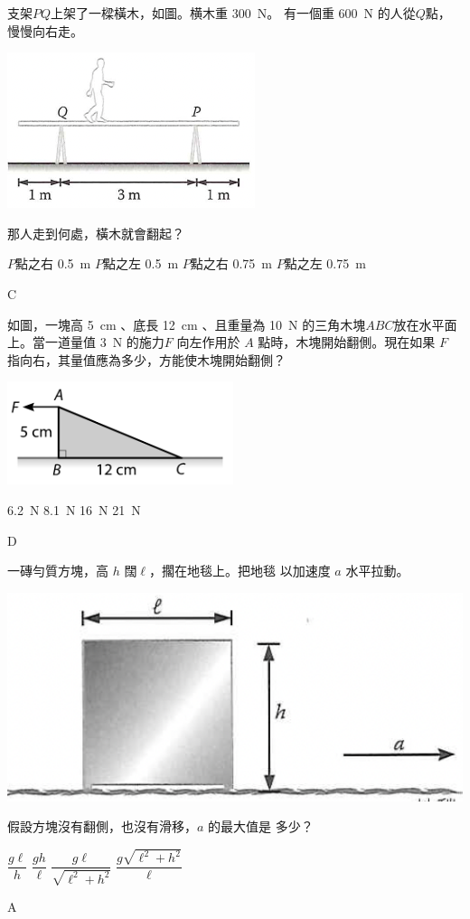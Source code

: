 {
支架$PQ$上架了一樑橫木，如圖。横木重 \qty{300}{N}。 有一個重 \qty{600}{N} 的人從$Q$點，慢慢向右走。
{\par\centering
\includegraphics[width=.3\textwidth]{assets/efd30991.png}
\par}
那人走到何處，橫木就會翻起？
\begin{tasks}
    \task $P$點之右 \qty{0.5}{m}
    \task $P$點之左 \qty{0.5}{m}
    \task $P$點之右 \qty{0.75}{m}
    \task $P$點之左 \qty{0.75}{m}
\end{tasks}
}{C}

{
如圖，一塊高 \qty{5}{cm} 、底長 \qty{12}{cm} 、且重量為 \qty{10}{N} 的三角木塊$ABC$放在水平面上。當一道量值 \qty{3}{N} 的施力$F$ 向左作用於 $A$ 點時，木塊開始翻側。現在如果 $F$ 指向右，其量值應為多少，方能使木塊開始翻側？
{\par\centering
\includegraphics[width=.3\textwidth]{assets/ad661d08.png}
\par}
\begin{tasks}
    \task \qty{6.2}{N}
    \task \qty{8.1}{N}
    \task \qty{16}{N}
    \task \qty{21}{N}

\end{tasks}
}{D}

{
一磚勻質方塊，高 $h$ 闊$\ell$，擱在地毯上。把地毯 以加速度 $a$ 水平拉動。

{\par\centering
\includegraphics[width=.3\textwidth]{assets/5b765e46.png}
\par}
假設方塊沒有翻側，也沒有滑移，$a$ 的最大值是 多少？
\begin{tasks}
    \task $\dfrac{g\ell}{h}$
    \task $\dfrac{gh}{\ell}$
    \task $\dfrac{g\ell}{\sqrt{\ell^2+h^2}}$
    \task $\dfrac{g\sqrt{\ell^2+h^2}}{\ell}$
\end{tasks}
}{A}


